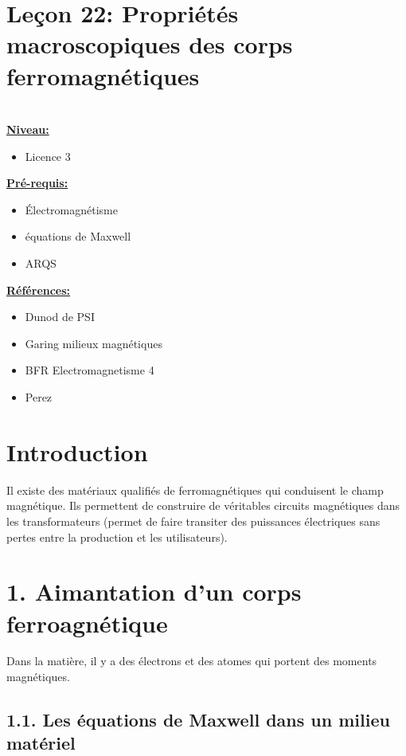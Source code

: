 \documentclass[french, a4paper, 10pt, twocolumn, landscape]{article}
\begin{document}
\section*{Leçon 22: Propriétés macroscopiques des corps ferromagnétiques}

\hrulefill\\

\noindent\underline{\textbf{Niveau:}} 
\begin{itemize}
    \item Licence 3
\end{itemize}

\noindent\underline{\textbf{Pré-requis:}}
\begin{itemize}
    \item Électromagnétisme
    \item équations de Maxwell
    \item ARQS
\end{itemize}

\noindent\underline{\textbf{Références:}}

\begin{itemize}
\item Dunod de PSI
\item Garing milieux magnétiques
\item BFR Electromagnetisme 4
\item Perez 
\end{itemize}

\hrulefill

\section*{Introduction}
Il existe des matériaux qualifiés de ferromagnétiques qui conduisent le champ magnétique. Ils permettent de construire de véritables circuits magnétiques dans les transformateurs (permet de faire transiter des puissances électriques sans pertes entre la production et les utilisateurs). 

\section*{1. Aimantation d'un corps ferroagnétique}
Dans la matière, il y a des électrons et des atomes qui portent des moments magnétiques. 


\subsection*{1.1. Les équations de Maxwell dans un milieu matériel}
\end{document}
